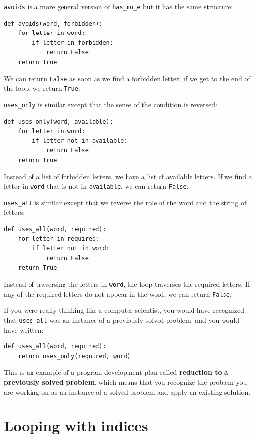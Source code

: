 \documentclass[10pt]{book}
\begin{document}
{\tt avoids} is a more general version of \verb"has_no_e" but it
has the same structure:

\begin{verbatim}
def avoids(word, forbidden):
    for letter in word:
        if letter in forbidden:
            return False
    return True
\end{verbatim}
%
We can return {\tt False} as soon as we find a forbidden letter;
if we get to the end of the loop, we return {\tt True}.

\verb"uses_only" is similar except that the sense of the condition
is reversed:

\begin{verbatim}
def uses_only(word, available):
    for letter in word:
        if letter not in available:
            return False
    return True
\end{verbatim}
%
Instead of a list of forbidden letters, we have a list of available
letters.  If we find a letter in {\tt word} that is not in
{\tt available}, we can return {\tt False}.

\verb"uses_all" is similar except that we reverse the role
of the word and the string of letters:

\begin{verbatim}
def uses_all(word, required):
    for letter in required:
        if letter not in word:
            return False
    return True
\end{verbatim}
%
Instead of traversing the letters in {\tt word}, the loop
traverses the required letters.  If any of the required letters
do not appear in the word, we can return {\tt False}.

If you were really thinking like a computer scientist, you would
have recognized that \verb"uses_all" was an instance of a
previously solved problem, and you would have written:

\begin{verbatim}
def uses_all(word, required):
    return uses_only(required, word)
\end{verbatim}
%
This is an example of a program development plan called {\bf
  reduction to a previously solved problem}, which means that you
recognize the problem you are working on as an instance of a solved
problem and apply an existing solution.   


\section{Looping with indices}
\end{document}
